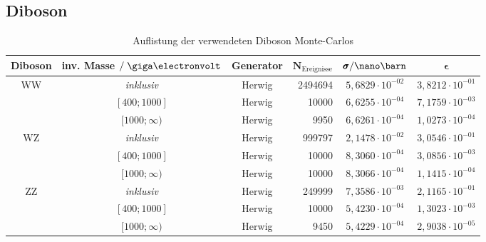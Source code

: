 \subsection*{Diboson} 
\begin{table}[h]
    \centering
    \begin{tabular}{|c|c|c|r|c|c|}
        \hline
        \bf{Diboson} & \bf{inv. Masse} $/\GeV$ & \bf{Generator} & $\pmb N_\text{Ereignisse}$ &
        $\pmb\sigma / \nano\barn$ & $\pmb\epsilon$ \\
        \hline \hline
        \multirow{3}{*}{WW}
            & \it{inklusiv}     & Herwig & 2494694 & $5,6829\cdot 10^{-02}$ & $3,8212\cdot 10^{-01}$ \\
            & $[400 ; 1000]$    & Herwig & 10000   & $6,6255\cdot 10^{-04}$ & $7,1759\cdot 10^{-03}$ \\
            & $[1000 ; \infty)$ & Herwig & 9950    & $6,6261\cdot 10^{-04}$ & $1,0273\cdot 10^{-04}$ \\
        \hline
        \multirow{3}{*}{WZ}
            & \it{inklusiv}     & Herwig & 999797  & $2,1478\cdot 10^{-02}$ & $3,0546\cdot 10^{-01}$ \\
            & $[400 ; 1000]$    & Herwig & 10000   & $8,3060\cdot 10^{-04}$ & $3,0856\cdot 10^{-03}$ \\
            & $[1000 ; \infty)$ & Herwig & 10000   & $8,3066\cdot 10^{-04}$ & $1,1415\cdot 10^{-04}$ \\
        \hline
        \multirow{3}{*}{ZZ}
            & \it{inklusiv}     & Herwig & 249999  & $7,3586\cdot 10^{-03}$ & $2,1165\cdot 10^{-01}$ \\
            & $[400 ; 1000]$    & Herwig & 10000   & $5,4230\cdot 10^{-04}$ & $1,3023\cdot 10^{-03}$ \\
            & $[1000 ; \infty)$ & Herwig & 9450    & $5,4229\cdot 10^{-04}$ & $2,9038\cdot 10^{-05}$ \\
        \hline
    \end{tabular}
    \caption{Auflistung der verwendeten Diboson Monte-Carlos} 
\end{table}
\FloatBarrier


